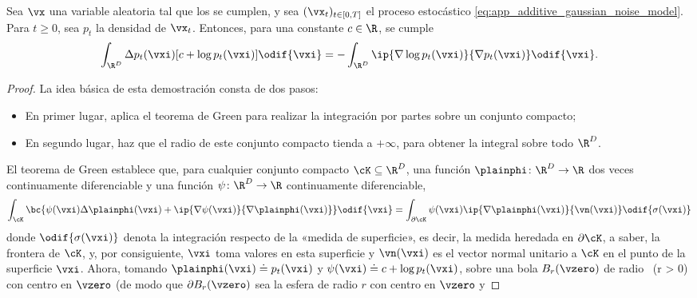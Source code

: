 \documentclass[../../book-main_es.tex]{subfiles}
\begin{document}
\begin{lemma}\label{lem:diffusion_ibp}
    Sea \(\vx\) una variable aleatoria tal que los
    se cumplen, y sea \((\vx_{t})_{t \in [0, T]}\) el proceso estocástico
    \eqref{eq:app_additive_gaussian_noise_model}. Para \(t
    \geq 0\), sea \(p_{t}\) la densidad de \(\vx_{t}\). Entonces, para una
    constante \(c \in \R\), se cumple
    \begin{equation}
        \int_{\R^{D}}\Delta p_{t}(\vxi)[c + \log
        p_{t}(\vxi)]\odif{\vxi} = -\int_{\R^{D}}\ip{\nabla \log
        p_{t}(\vxi)}{\nabla p_{t}(\vxi)}\odif{\vxi}.
    \end{equation}
\end{lemma}
\begin{proof}
    La idea básica de esta demostración consta de dos pasos:
    \begin{itemize}
        \item En primer lugar, aplica el teorema de Green para realizar la integración por partes
            sobre un conjunto compacto;
        \item En segundo lugar, haz que el radio de este conjunto compacto tienda a
            \(+\infty\), para obtener la integral sobre todo \(\R^{D}\).
    \end{itemize}
    El teorema de Green establece que, para cualquier conjunto compacto \(\cK \subseteq
    \R^{D}\), una función \(\plainphi \colon
    \R^{D} \to \R\) dos veces continuamente diferenciable y una función \(\psi \colon
    \R^{D} \to \R\) continuamente diferenciable,
    \begin{equation}
        \int_{\cK}\bc{\psi(\vxi) \Delta \plainphi(\vxi) + \ip{\nabla
        \psi(\vxi)}{\nabla \plainphi(\vxi)}}\odif{\vxi} =
        \int_{\partial \cK}\psi(\vxi)\ip{\nabla
        \plainphi(\vxi)}{\vn(\vxi)}\odif{\sigma(\vxi)}
    \end{equation}
    donde \(\odif{\sigma(\vxi)}\) denota la integración respecto de la
    «medida de superficie», es decir, la medida heredada en \(\partial
    \cK\), a saber, la frontera de \(\cK\), y, por consiguiente, \(\vxi\)
    toma valores en esta superficie y \(\vn(\vxi)\) es el vector normal unitario
    a \(\cK\) en el punto de la superficie \(\vxi\). Ahora, tomando
    \(\plainphi(\vxi) \doteq p_{t}(\vxi)\) y \(\psi(\vxi) \doteq c
    + \log p_{t}(\vxi)\), sobre una bola \(B_{r}(\vzero)\) de radio \ (r
    > 0) con centro en \(\vzero\) (de modo que \(\partial B_{r}(\vzero)\)
        sea la esfera de radio \(r\) con centro en \(\vzero\) y

\end{proof}
\end{document}
